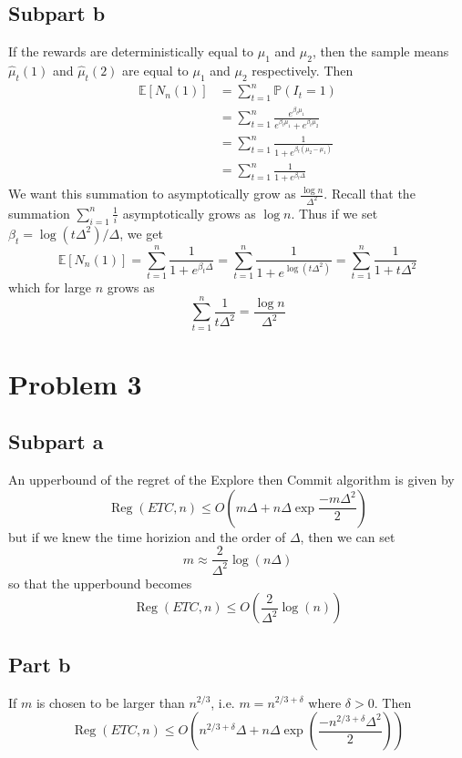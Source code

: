 \documentclass{article}
\theoremstyle{mytheoremstyle}
\theoremstyle{mytheoremstyle}
\theoremstyle{myproblemstyle}
\DeclareMathOperator{\Reg}{Reg}
\begin{document}
\subsection*{Subpart b}
If the rewards are deterministically equal to $\mu_1$ and $\mu_2$, then the sample means $\hat\mu_t(1)$ and $\hat\mu_t(2)$ are equal to $\mu_1$ and $\mu_2$ respectively.
Then 
\begin{align*}
  \mathbb E[N_n(1)] &= \sum_{t=1}^n \mathbb P(I_t = 1) \\
                    &= \sum_{t=1}^n \frac{e^{\beta_t \mu_1}}{e^{\beta_t \mu_1} + e^{\beta_t \mu_2}}\\ 
                    &= \sum_{t=1}^n \frac{1}{1 + e^{\beta_t (\mu_2 - \mu_1)}}\\
                    &= \sum_{t=1}^n \frac{1}{1 + e^{\beta_t \Delta}}
\end{align*}
We want this summation to asymptotically grow as $\frac{\log n}{\Delta^2}$.
Recall that the summation $\sum_{i = 1}^n \frac{1}{i}$ asymptotically grows as $\log n$.
Thus if we set $\beta_t = \log(t\Delta^2)/\Delta$, we get
$$ \mathbb E[N_n(1)] = \sum_{t=1}^n \frac{1}{1 + e^{\beta_t \Delta}} = \sum_{t=1}^n \frac{1}{1 + e^{\log(t\Delta^2)}} = \sum_{t=1}^n \frac{1}{1 + t\Delta^2}$$
which for large $n$ grows as $$\sum_{t=1}^n \frac{1}{t\Delta^2} = \frac{\log n}{\Delta^2}$$

\section*{Problem 3}
\subsection*{Subpart a}
An upperbound of the regret of the Explore then Commit algorithm is given by 
\[
  \Reg(ETC, n) \leq O(m\Delta + n\Delta\exp{\frac{-m\Delta^2}{2}})
\]
but if we knew the time horizion and the order of $\Delta$, then we can set 
\[
  m \approx \frac{2}{\Delta^2} \log(n\Delta)
\]
so that the upperbound becomes 
\[
  \Reg(ETC, n) \leq O(\frac{2}{\Delta^2}\log(n))
\]

\subsection*{Part b}
If $m$ is chosen to be larger than $n^{2/3}$, i.e. $m = n^{2/3+\delta}$ where $\delta>0$.
Then 
\[
  \Reg(ETC, n) \leq O(n^{2/3+\delta}\Delta + n\Delta\exp{(\frac{-n^{2/3 + \delta}\Delta^2}{2})})
\]
\end{document}
